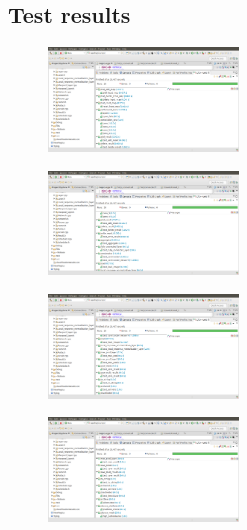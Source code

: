 \documentclass[parskip=full]{scrartcl}
\begin{document}
\pagebreak
\subsection {Test results}
\begin{figure}[b]
\centering
\includegraphics[width=0.45\textwidth, center]{test1}
\end{figure}
\begin{figure}[b]
\centering
\includegraphics[width=0.45\textwidth, center]{test2}
\end{figure}
\begin{figure}[b]
\centering
\includegraphics[width=0.45\textwidth, center]{test3}
\end{figure}
\begin{figure}[b]
\centering
\includegraphics[width=0.45\textwidth, center]{test4}
\end{figure}


\pagebreak
\end{document}
